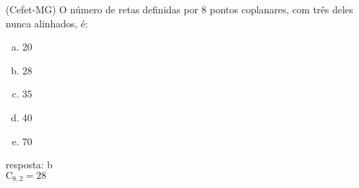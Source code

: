 \begin{ex}
(Cefet-MG) O número de retas definidas por 8 pontos coplanares, com três deles nunca alinhados, é:
   \begin{enumerate}[(a)]
   \item 20
   \item 28
   \item 35
   \item 40
   \item 70
   \end{enumerate}
     \begin{sol}
       resposta: b \\
       $\mathrm{C}_{8,2}= 28$
     \end{sol}
\end{ex}